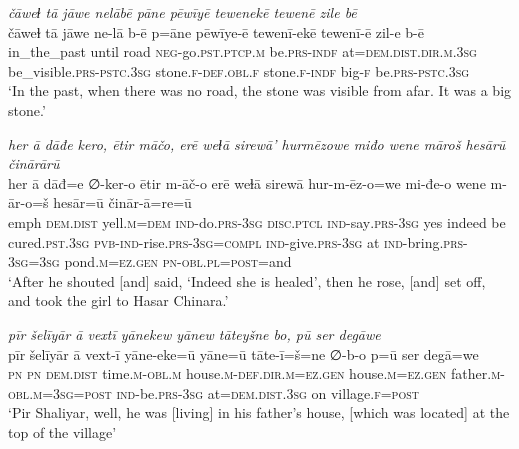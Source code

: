 \ea \label{ZP.54}
\textit{čāweɫ tā jāwe nelābē pāne pēwīyē tewenekē tewenē zile bē} \\ 
\gll čāweɫ tā jāwe ne-lā b-ē p=āne pēwīye-ē tewenī-ekē tewenī-ē zil-e b-ē \\ 
 in\_the\_past until road \textsc{neg-}go\textsc{.pst}\textsc{.ptcp}\textsc{.m} be\textsc{.prs}\textsc{-indf} at=\textsc{dem.dist}\textsc{.dir}\textsc{.m}\textsc{.3sg} be\_visible\textsc{.prs}\textsc{-pstc}\textsc{.3sg} stone\textsc{.f}\textsc{-def}\textsc{.obl}\textsc{.f} stone\textsc{.f}\textsc{-indf} big\textsc{-f} be\textsc{.prs}\textsc{-pstc}\textsc{.3sg} \\ 
\glt `In the past, when there was no road, the stone was visible from afar. It was a big stone.'
\z 
 
\ea \label{ZP.61}
\textit{her ā dāđe kero, ētir māčo, erē weɫā sirewā’ hurmēzowe miđo wene māroš hesārū činārārū} \\ 
\gll her ā dāđ=e ∅-ker-o ētir m-āč-o erē weɫā sirewā hur-m-ēz-o=we mi-đe-o wene m-ār-o=š hesār=ū činār-ā=re=ū \\ 
 emph \textsc{dem.dist} yell\textsc{.m}\textsc{=dem} \textsc{ind-}do\textsc{.prs}\textsc{-3sg} \textsc{disc.ptcl} \textsc{ind-}say\textsc{.prs}\textsc{-3sg} yes indeed be cured\textsc{.pst}\textsc{.3sg} \textsc{pvb-}\textsc{ind-}rise\textsc{.prs}\textsc{-3sg}\textsc{=compl} \textsc{ind-}give\textsc{.prs}\textsc{-3sg} at \textsc{ind-}bring\textsc{.prs}\textsc{-3sg}\textsc{=3sg} pond\textsc{.m}\textsc{\textsc{=ez.gen}} \textsc{pn}\textsc{-obl}\textsc{.pl}\textsc{=\textsc{post}}=and \\ 
\glt `After he shouted [and] said, ‘Indeed she is healed’, then he rose, [and] set off, and took the girl to Hasar Chinara.'
\z 
 
\ea \label{ZP.65}
\textit{pīr šelīyār ā vextī yānekew yānew tāteyšne bo, pū ser degāwe} \\ 
\gll pīr šelīyār ā vext-ī yāne-eke=ū yāne=ū tāte-ī=š=ne ∅-b-o p=ū ser degā=we \\ 
 \textsc{pn} \textsc{pn} \textsc{dem.dist} time\textsc{.m}\textsc{-obl}\textsc{.m} house\textsc{.m}\textsc{-def}\textsc{.dir}\textsc{.m}\textsc{\textsc{=ez.gen}} house\textsc{.m}\textsc{\textsc{=ez.gen}} father\textsc{.m}\textsc{-obl}\textsc{.m}\textsc{=3sg}\textsc{=\textsc{post}} \textsc{ind-}be\textsc{.prs}\textsc{-3sg} at=\textsc{dem.dist}\textsc{.3sg} on village\textsc{.f}\textsc{=\textsc{post}} \\ 
\glt `Pir Shaliyar, well, he was [living] in his father’s house, [which was located] at the top of the village'
\z 
 
